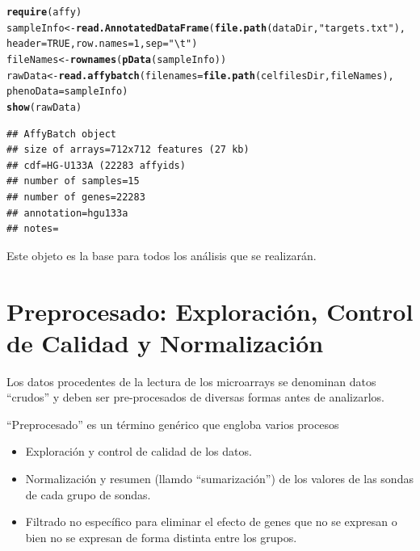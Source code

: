 \documentclass[a4paper]{article}\usepackage[]{graphicx}\usepackage[]{color}
\makeatletter
\newcommand{\hlnum}[1]{\textcolor[rgb]{0.686,0.059,0.569}{#1}}%
\newcommand{\hlstr}[1]{\textcolor[rgb]{0.192,0.494,0.8}{#1}}%
\newcommand{\hlstd}[1]{\textcolor[rgb]{0.345,0.345,0.345}{#1}}%
\newcommand{\hlkwb}[1]{\textcolor[rgb]{0.69,0.353,0.396}{#1}}%
\newcommand{\hlkwc}[1]{\textcolor[rgb]{0.333,0.667,0.333}{#1}}%
\newcommand{\hlkwd}[1]{\textcolor[rgb]{0.737,0.353,0.396}{\textbf{#1}}}%
\newenvironment{kframe}{%
 \def\at@end@of@kframe{}%
 \ifinner\ifhmode%
  \def\at@end@of@kframe{\end{minipage}}%
  \begin{minipage}{\columnwidth}%
 \fi\fi%
 \def\FrameCommand##1{\hskip\@totalleftmargin \hskip-\fboxsep
 \colorbox{shadecolor}{##1}\hskip-\fboxsep
     \hskip-\linewidth \hskip-\@totalleftmargin \hskip\columnwidth}%
 \MakeFramed {\advance\hsize-\width
   \@totalleftmargin\z@ \linewidth\hsize
   \@setminipage}}%
 {\par\unskip\endMakeFramed%
 \at@end@of@kframe}
\newenvironment{knitrout}{}{} %
\makeatother
\begin{document}
\begin{knitrout}
\color{fgcolor}\begin{kframe}
\begin{alltt}
\hlkwd{require}\hlstd{(affy)}
\hlstd{sampleInfo} \hlkwb{<-} \hlkwd{read.AnnotatedDataFrame}\hlstd{(}\hlkwd{file.path}\hlstd{(dataDir,}\hlstr{"targets.txt"}\hlstd{),}
    \hlkwc{header} \hlstd{=} \hlnum{TRUE}\hlstd{,} \hlkwc{row.names} \hlstd{=} \hlnum{1}\hlstd{,} \hlkwc{sep}\hlstd{=}\hlstr{"\textbackslash{}t"}\hlstd{)}
\hlstd{fileNames} \hlkwb{<-} \hlkwd{rownames}\hlstd{(}\hlkwd{pData}\hlstd{(sampleInfo))}
\hlstd{rawData} \hlkwb{<-} \hlkwd{read.affybatch}\hlstd{(}\hlkwc{filenames}\hlstd{=}\hlkwd{file.path}\hlstd{(celfilesDir,fileNames),}
                          \hlkwc{phenoData}\hlstd{=sampleInfo)}
\hlkwd{show}\hlstd{(rawData)}
\end{alltt}


{\ttfamily\noindent\color{warningcolor}{\#\# Warning: replacing previous import 'AnnotationDbi::tail' by 'utils::tail' when loading 'hgu133acdf'}}

{\ttfamily\noindent\color{warningcolor}{\#\# Warning: replacing previous import 'AnnotationDbi::head' by 'utils::head' when loading 'hgu133acdf'}}

{\ttfamily\noindent\itshape\color{messagecolor}{\#\# }}\begin{verbatim}
## AffyBatch object
## size of arrays=712x712 features (27 kb)
## cdf=HG-U133A (22283 affyids)
## number of samples=15
## number of genes=22283
## annotation=hgu133a
## notes=
\end{verbatim}
\end{kframe}
\end{knitrout}

Este objeto es la base para todos los análisis que se realizarán.


\section{Preprocesado: Exploración, Control de Calidad y Normalización}

Los datos procedentes de la lectura de los microarrays se denominan datos ``crudos'' y deben ser pre-procesados de diversas formas antes de analizarlos.

``Preprocesado'' es un término genérico que engloba varios procesos
\begin{itemize}
\item Exploración y control de calidad de los datos.
\item Normalización y resumen (llamdo ``sumarización'') de los valores de las sondas de cada grupo de sondas.
\item Filtrado no específico para eliminar el efecto de genes que no se expresan o bien no se expresan de forma distinta entre los grupos.
\end{itemize}
\end{document}
